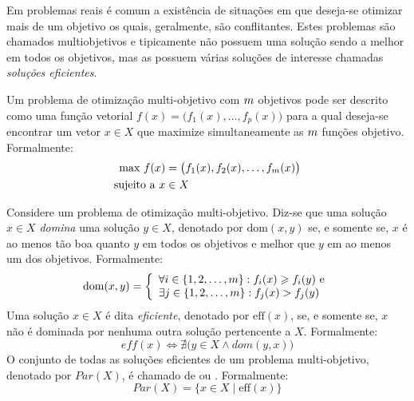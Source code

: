 

Em problemas reais é comum a existência de situações em que deseja-se otimizar
mais de um objetivo os quais, geralmente, são conflitantes.
Estes problemas são chamados multiobjetivos e tipicamente não possuem
uma solução sendo a melhor em todos os objetivos, mas as possuem várias
soluções de interesse chamadas \emph{soluções eficientes}.

Um problema de otimização multi-objetivo com $m$ objetivos pode ser descrito como uma
função vetorial $f(x) = \big(f_1(x), \ldots, f_p(x)\big)$
para a qual deseja-se encontrar um vetor $x \in X$
que maximize simultaneamente as $m$ funções objetivo.
Formalmente:
\begin{align*}
  \text{max} ~ f(x) &=
    \big(f_1(x)
    ,f_2(x)
    ,\ldots
    ,f_{m}(x)\big) \\
  \text{sujeito a} ~ x & \in X
\end{align*}

\begin{mydef}
Considere um problema de otimização multi-objetivo.
Diz-se que uma solução $x \in X$
\emph{domina} uma solução $y \in X$, denotado por $\text{dom}(x, y)$
se, e somente se, $x$ é ao menos tão boa quanto
$y$ em todos os objetivos e melhor que $y$ em ao menos um dos objetivos.
Formalmente:
\begin{equation}
    \text{dom}(x, y) = \left\{
      \begin{array}{l}
          \forall i \in \{1, 2, \ldots, m\}: f_i(x) \geqslant f_i(y) ~\text{e}\\
          \exists j \in \{1, 2, \ldots, m\}: f_j(x) > f_j(y)
  \end{array} \right.
  \label{eq:dom}
\end{equation}
Uma solução $x \in X$ é dita \emph{eficiente}, denotado por $\text{eff}(x)$,
se, e somente se, $x$ não é dominada por nenhuma outra solução pertencente a $X$.
Formalmente:
\begin{displaymath}
  eff(x) \iff \nexists \big(y \in X \wedge dom(y, x) \big)
\end{displaymath}
O conjunto de todas as soluções eficientes de um problema multi-objetivo,
denotado por $Par(X)$, é chamado de \emph{\paretoset{}} ou \emph{\paretosetII{}}.
Formalmente:
\begin{displaymath}
  Par(X) = \{ x \in X \;|\; \text{eff}(x)\}
\end{displaymath}
\end{mydef}

